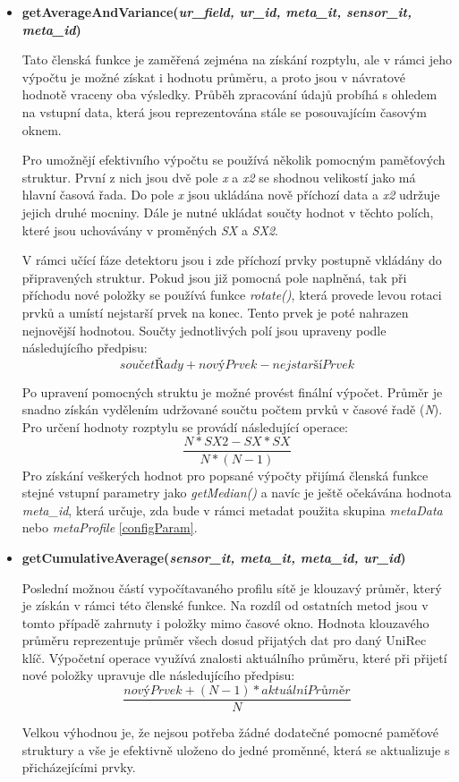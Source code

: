 \begin{itemize}
 \item \textbf{getAverageAndVariance(\textit{ur\_field, ur\_id, meta\_it, sensor\_it, meta\_id})}
 
 Tato členská funkce je zaměřená zejména na získání rozptylu, ale v rámci jeho výpočtu je možné
 získat i hodnotu průměru, a proto jsou v návratové hodnotě vraceny oba výsledky. Průběh
 zpracování údajů probíhá s ohledem na vstupní data, která 
 jsou reprezentována stále se posouvajícím časovým oknem. 
 
 Pro umožnějí efektivního výpočtu se používá několik pomocným paměťových struktur. První z nich 
 jsou dvě pole \textit{x} a \textit{x2} se shodnou velikostí jako má hlavní časová řada. Do pole
 \textit{x} jsou ukládána
 nově příchozí data a \textit{x2} udržuje jejich druhé mocniny. Dále je nutné ukládat součty
 hodnot v těchto polích, které jsou uchovávány v proměných \textit{SX} a \textit{SX2}.
 
 V rámci učící fáze detektoru jsou i zde příchozí prvky postupně vkládány do připravených struktur.
 Pokud jsou již pomocná pole naplněná, tak při příchodu nové položky se používá funkce
 \textit{rotate()}, která provede levou rotaci prvků a umístí nejstarší prvek na konec. Tento
 prvek je poté nahrazen nejnovější hodnotou. Součty jednotlivých polí jsou upraveny podle 
 následujícího předpisu:  
 \[
  součetŘady + novýPrvek - nejstaršíPrvek
\]
 
 Po upravení pomocných struktu je možné provést finální výpočet. Průměr je snadno získán vydělením
 udržované součtu počtem prvků v časové řadě (\textit{N}). Pro určení hodnoty rozptylu se provádí
 následující operace:
\[
   \frac{N * SX2 - SX * SX}{N * (N - 1)}
\]
Pro získání veškerých hodnot pro popsané výpočty přijímá členská funkce stejné vstupní parametry
jako \textit{getMedian()} a navíc je ještě očekávána hodnota \textit{meta\_id}, která určuje, 
zda bude v rámci metadat použita skupina \textit{metaData} nebo \textit{metaProfile} \ref{configParam}. 

 \item \textbf{getCumulativeAverage(\textit{sensor\_it, meta\_it, meta\_id, ur\_id})}
 
 Poslední možnou částí vypočítavaného profilu sítě je klouzavý průměr, který je získán v rámci 
 této členské funkce. Na rozdíl od ostatních metod jsou v tomto případě zahrnuty i položky 
 mimo časové okno. Hodnota klouzavého průměru reprezentuje průměr všech dosud přijatých dat pro 
 daný UniRec klíč. Výpočetní operace využívá znalosti aktuálního průměru, které při přijetí 
 nové položky upravuje dle následujícího předpisu:
 \[
   \frac{novýPrvek + (N - 1) * aktuálníPrůměr}{N}
\]
 
 
 Velkou výhodnou je, že nejsou potřeba žádné dodatečné pomocné paměťové struktury a vše je 
 efektivně uloženo do jedné proměnné, která se aktualizuje s přicházejícími prvky.
\end{itemize}

